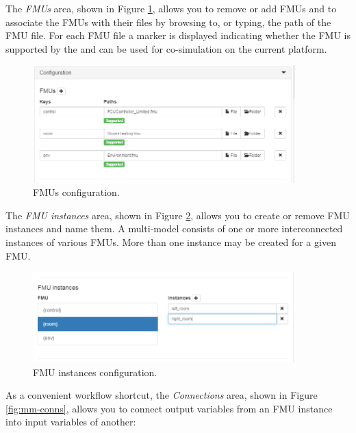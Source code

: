 The \textit{FMUs} area, shown in Figure \ref{fig:mm-fmus}, allows you to remove or add
FMUs and to associate the FMUs with their files by browsing to,
or typing, the path of the FMU file. For each FMU file a marker is
displayed indicating whether the FMU is supported by the \intoapp{} and can be used for co-simulation on the current platform.
%
%
%
\begin{figure}[h!]
\centering
\includegraphics[width=0.9\textwidth]{./figures/app/mm-fmus}
\caption{FMUs configuration.}
\label{fig:mm-fmus}
\end{figure}
%
%
%
The \textit{FMU instances} area, shown in Figure \ref{fig:mm-instances}, allows you to
create or remove FMU instances and name them. A multi-model consists of one or more interconnected instances of various FMUs. More than one instance may be created for a given FMU.
%
%
%
\begin{figure}[h!]
\centering
\includegraphics[width=0.9\textwidth]{./figures/app/mm-instances}
\caption{FMU instances configuration.}
\label{fig:mm-instances}
\end{figure}
%
%
%
As a convenient workflow shortcut, the \textit{Connections} area, shown in Figure \ref{fig:mm-conns}, allows you to
connect output variables from an FMU instance into input variables of another:

